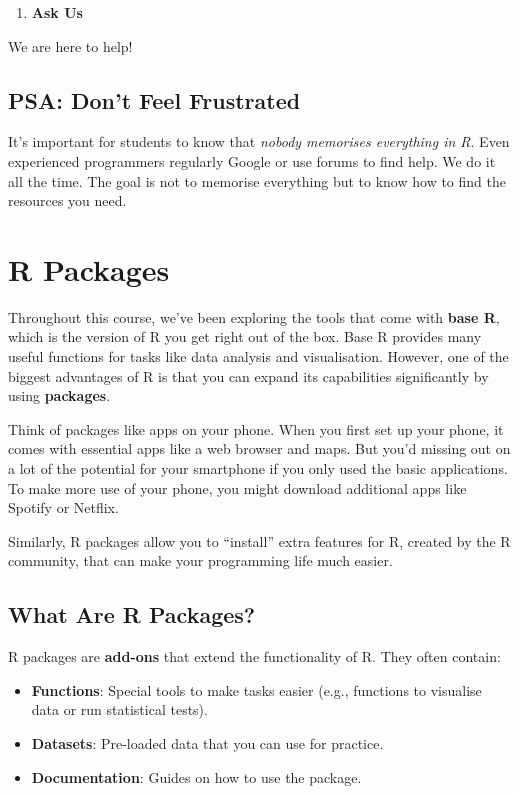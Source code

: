 \documentclass[
]{book}
\providecommand{\tightlist}{%
  \setlength{\itemsep}{0pt}\setlength{\parskip}{0pt}}
\begin{document}
\begin{enumerate}
\def\labelenumi{\arabic{enumi}.}
\setcounter{enumi}{2}
\tightlist
\item
  \textbf{Ask Us}
\end{enumerate}

We are here to help!

\subsection{PSA: Don't Feel Frustrated}\label{psa-dont-feel-frustrated}

It's important for students to know that \emph{nobody memorises everything in R}. Even experienced programmers regularly Google or use forums to find help. We do it all the time. The goal is not to memorise everything but to know how to find the resources you need.

\section{R Packages}\label{r-packages}

Throughout this course, we've been exploring the tools that come with \textbf{base R}, which is the version of R you get right out of the box. Base R provides many useful functions for tasks like data analysis and visualisation. However, one of the biggest advantages of R is that you can expand its capabilities significantly by using \textbf{packages}.

Think of packages like apps on your phone. When you first set up your phone, it comes with essential apps like a web browser and maps. But you'd missing out on a lot of the potential for your smartphone if you only used the basic applications. To make more use of your phone, you might download additional apps like Spotify or Netflix.

Similarly, R packages allow you to ``install'' extra features for R, created by the R community, that can make your programming life much easier.

\subsection{What Are R Packages?}\label{what-are-r-packages}

R packages are \textbf{add-ons} that extend the functionality of R. They often contain:

\begin{itemize}
\item
  \textbf{Functions}: Special tools to make tasks easier (e.g., functions to visualise data or run statistical tests).
\item
  \textbf{Datasets}: Pre-loaded data that you can use for practice.
\item
  \textbf{Documentation}: Guides on how to use the package.
\end{itemize}
\end{document}
